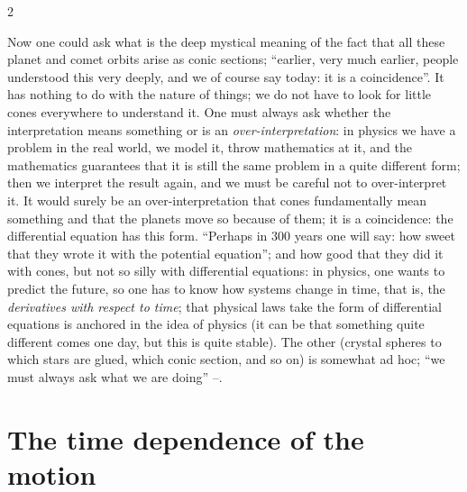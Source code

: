 \begin{paracol}{2}
\begin{secondary}
Now one could ask what is the deep mystical meaning of the fact that all these planet and comet orbits arise as conic sections; ``earlier, very much earlier, people understood this very deeply, and we of course say today: it is a coincidence''. It has nothing to do with the nature of things; we do not have to look for little cones everywhere to understand it. One must always ask whether the interpretation means something or is an \emph{over-interpretation}: in physics we have a problem in the real world, we model it, throw mathematics at it, and the mathematics guarantees that it is still the same problem in a quite different form;
then we interpret the result again, and we must be careful not to over-interpret it. It would surely be an over-interpretation that cones fundamentally mean something and that the planets move so because of them; it is a coincidence: the differential equation has this form. ``Perhaps in 300 years one will say: how sweet that they wrote it with the potential equation''; and how good that they did it with cones, but not so silly with differential equations: in physics, one wants to predict the future, so one has to know how systems change in time, that is, the \emph{derivatives with respect to time}; that physical laws take the form of differential equations is anchored in the idea of physics (it can be that something quite different comes one day, but this is quite stable).
The other (crystal spheres to which stars are glued, which conic section, and so on) is somewhat ad hoc; ``we must always ask what we are doing'' --.
\end{secondary}

\section{The time dependence of the motion}\label{sec:tb-time}


\end{paracol}
